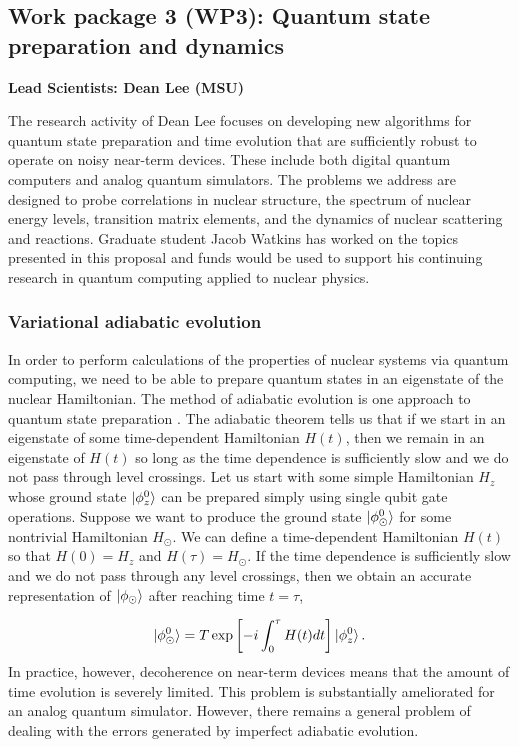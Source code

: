 \documentclass[10pt]{article}
\begin{document}
\subsection{Work package 3 (WP3): Quantum state preparation and dynamics}
{\bf Lead Scientists: Dean Lee (MSU)}

The research activity of Dean Lee focuses on developing new algorithms for quantum state preparation and time evolution that are sufficiently robust to operate on noisy near-term devices.  These include both digital quantum computers and analog quantum simulators.  The problems we address are designed to probe correlations in nuclear structure, the spectrum of nuclear energy levels, transition matrix elements, and the dynamics of nuclear scattering and reactions.  Graduate  student Jacob Watkins has worked on the topics presented in this proposal and funds would be used to support his continuing research in quantum computing applied to nuclear physics. 





\subsubsection{Variational adiabatic evolution}

In order to perform calculations of the properties of nuclear systems
via quantum computing, we need to be able to prepare quantum states in
an eigenstate of the nuclear Hamiltonian. The method of adiabatic
evolution is one approach to quantum state preparation
\cite{Farhi:2000a}.  The adiabatic theorem tells us that if we start
in an eigenstate of some time-dependent Hamiltonian $H(t)$, then we
remain in an eigenstate of $H(t)$ so long as the time dependence is
sufficiently slow and we do not pass through level crossings.  Let us
start with some simple Hamiltonian $H_z$ whose ground state
$\ket{\phi^0_z}$ can be prepared simply using single qubit gate
operations. Suppose we want to produce the ground state
$\ket{\phi^{0}_\odot}$ for some nontrivial Hamiltonian $H_\odot$.  We
can define a time-dependent Hamiltonian $H(t)$ so that $H(0)=H_z$ and
$H(\tau)=H_\odot$.  If the time dependence is sufficiently slow and we
do not pass through any level crossings, then we obtain an accurate
representation of $\ket{\phi_\odot}$ after reaching time $t = \tau$,

\begin{equation}
\ket{\phi_\odot^0} = T \exp\left[-i\int_0^\tau H(t) dt \right]\ket{\phi_z^{0}}.
\end{equation}  
In practice, however, decoherence on near-term devices means that the
amount of time evolution is severely limited.  This problem is
substantially ameliorated for an analog quantum simulator.  However,
there remains a general problem of dealing with the errors generated
by imperfect adiabatic evolution.
\end{document}

